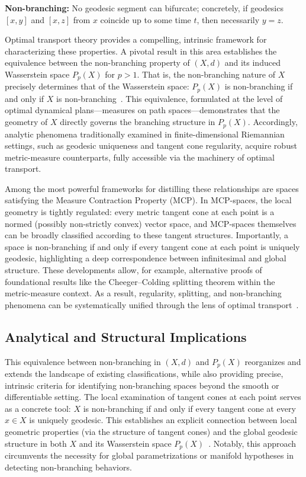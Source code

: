 \documentclass[sigconf]{acmart}
\begin{document}
\textbf{Non-branching:} No geodesic segment can bifurcate; concretely, if geodesics $[x, y]$ and $[x, z]$ from $x$ coincide up to some time $t$, then necessarily $y = z$.

Optimal transport theory provides a compelling, intrinsic framework for characterizing these properties. A pivotal result in this area establishes the equivalence between the non-branching property of $(X, d)$ and its induced Wasserstein space $P_p(X)$ for $p > 1$. That is, the non-branching nature of $X$ precisely determines that of the Wasserstein space: $P_p(X)$ is non-branching if and only if $X$ is non-branching~\cite{ref107}. This equivalence, formulated at the level of optimal dynamical plans—measures on path spaces—demonstrates that the geometry of $X$ directly governs the branching structure in $P_p(X)$. Accordingly, analytic phenomena traditionally examined in finite-dimensional Riemannian settings, such as geodesic uniqueness and tangent cone regularity, acquire robust metric-measure counterparts, fully accessible via the machinery of optimal transport.

Among the most powerful frameworks for distilling these relationships are spaces satisfying the Measure Contraction Property (MCP). In MCP-spaces, the local geometry is tightly regulated: every metric tangent cone at each point is a normed (possibly non-strictly convex) vector space, and MCP-spaces themselves can be broadly classified according to these tangent structures. Importantly, a space is non-branching if and only if every tangent cone at each point is uniquely geodesic, highlighting a deep correspondence between infinitesimal and global structure. These developments allow, for example, alternative proofs of foundational results like the Cheeger–Colding splitting theorem within the metric-measure context. As a result, regularity, splitting, and non-branching phenomena can be systematically unified through the lens of optimal transport~\cite{ref107}.

\subsection{Analytical and Structural Implications}

This equivalence between non-branching in $(X, d)$ and $P_p(X)$ reorganizes and extends the landscape of existing classifications, while also providing precise, intrinsic criteria for identifying non-branching spaces beyond the smooth or differentiable setting. The local examination of tangent cones at each point serves as a concrete tool: $X$ is non-branching if and only if every tangent cone at every $x \in X$ is uniquely geodesic. This establishes an explicit connection between local geometric properties (via the structure of tangent cones) and the global geodesic structure in both $X$ and its Wasserstein space $P_p(X)$~\cite{ref107}. Notably, this approach circumvents the necessity for global parametrizations or manifold hypotheses in detecting non-branching behaviors.
\end{document}
